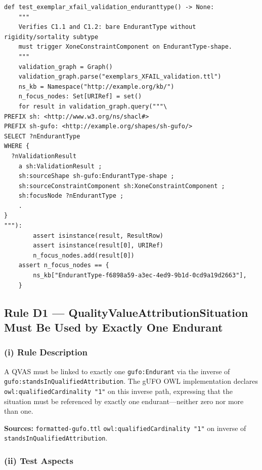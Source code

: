 \documentclass[12pt,a4paper]{article}
\newcommand{\gufoclass}[1]{\nolinkurl{gufo:#1}}
\newcommand{\gufoprop}[1]{\nolinkurl{gufo:#1}}
\begin{document}
\begin{lstlisting}[style=pythonstyle]
def test_exemplar_xfail_validation_enduranttype() -> None:
    """
    Verifies C1.1 and C1.2: bare EndurantType without rigidity/sortality subtype
    must trigger XoneConstraintComponent on EndurantType-shape.
    """
    validation_graph = Graph()
    validation_graph.parse("exemplars_XFAIL_validation.ttl")
    ns_kb = Namespace("http://example.org/kb/")
    n_focus_nodes: Set[URIRef] = set()
    for result in validation_graph.query("""\
PREFIX sh: <http://www.w3.org/ns/shacl#>
PREFIX sh-gufo: <http://example.org/shapes/sh-gufo/>
SELECT ?nEndurantType
WHERE {
  ?nValidationResult
    a sh:ValidationResult ;
    sh:sourceShape sh-gufo:EndurantType-shape ;
    sh:sourceConstraintComponent sh:XoneConstraintComponent ;
    sh:focusNode ?nEndurantType ;
    .
}
"""):
        assert isinstance(result, ResultRow)
        assert isinstance(result[0], URIRef)
        n_focus_nodes.add(result[0])
    assert n_focus_nodes == {
        ns_kb["EndurantType-f6898a59-a3ec-4ed9-9b1d-0cd9a19d2663"],
    }
\end{lstlisting}

\subsection{Rule D1 --- QualityValueAttributionSituation Must Be Used by Exactly One Endurant}
\label{sec:rule-d1}

\subsubsection*{(i) Rule Description}

A QVAS must be linked to exactly one \gufoclass{Endurant} via the inverse of
\gufoprop{standsInQualifiedAttribution}. The gUFO OWL implementation declares
\nolinkurl{owl:qualifiedCardinality "1"} on this inverse path, expressing that the
situation must be referenced by exactly one endurant---neither zero nor more
than one.

\textbf{Sources:} \texttt{formatted-gufo.ttl} \nolinkurl{owl:qualifiedCardinality "1"}
on inverse of \texttt{standsInQualifiedAttribution}.

\subsubsection*{(ii) Test Aspects}
\end{document}
